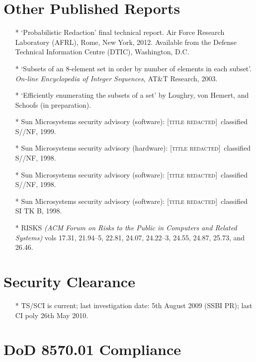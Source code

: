 \documentclass[letterpaper]{article}
\newcommand{\redacted}{\textsc{[title redacted]}}
\begin{document}
\section*{Other Published Reports}

\begin{itemize}
	\item[*] `Probabilistic Redaction' final technical report. Air Force Research
		Laboratory (AFRL), Rome, New York, 2012.  Available from the Defense Technical
		Information Centre (DTIC), Washington, D.C.

	\item[*] `Subsets of an 8-element set in order by number of elements in each
		subset'. \emph{On-line Encyclopedia of Integer Sequences}, AT\&T Research, 2003.

	\item[*] `Efficiently enumerating the subsets of a set' by Loughry, von Hemert,
		and Schoofs (in preparation).

    \item[*] Sun Microsystems security advisory (software): \redacted\ classified S//NF, 1999.
	\item[*] Sun Microsystems security advisory (hardware): \redacted\ classified S//NF, 1998.
	\item[*] Sun Microsystems security advisory (software): \redacted\ classified S//NF, 1998.
	\item[*] Sun Microsystems security advisory (software): \redacted\ classified SI TK B, 1998.

    \item[*] RISKS \emph{(ACM Forum on Risks to the Public in Computers
    and Related Systems)} vols 17.31, 21.94--5, 22.81, 24.07,
    24.22--3, 24.55, 24.87, 25.73, and 26.46.
\end{itemize}

\section*{Security Clearance}

\begin{itemize}
	\item[*] TS/SCI is current; last investigation date: 5th August 2009 (SSBI PR);
		last CI poly 26th May 2010.
\end{itemize}

\section*{DoD 8570.01 Compliance}
\end{document}
